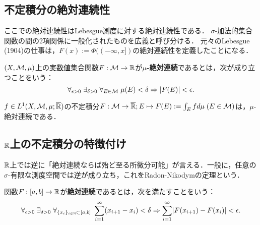 \documentclass[uplatex, dvipdfmx]{jsreport}
\begin{document}
\subsection{不定積分の絶対連続性}

\begin{tcolorbox}[colframe=ForestGreen, colback=ForestGreen!10!white,breakable,colbacktitle=ForestGreen!40!white,coltitle=black,fonttitle=\bfseries\sffamily,
title=]
    ここでの絶対連続性はLebesgue測度に対する絶対連続性である．
    $\sigma$-加法的集合関数の間の2項関係に一般化されたものを広義と呼び分ける．
    元々のLebesgue (1904)の仕事は，$F(x):=\Phi((-\infty,x])$の絶対連続性を定義したことになる．
\end{tcolorbox}

\begin{definition}[集合関数の絶対連続性]
    $(X,\mathcal{M},\mu)$上の\underline{実数値}集合関数$F:\mathcal{M}\to\mathbb{R}$が\textbf{$\mu$-絶対連続}であるとは，次が成り立つことをいう：
    \[\forall_{\epsilon>0}\;\exists_{\delta>0}\;\forall_{E\in\mathcal{M}}\;\mu(E)<\delta\Rightarrow\lvert F(E)\rvert<\epsilon.\]
\end{definition}

\begin{theorem}
    $f\in L^1(X,\mathcal{M},\mu;\overline{\mathbb{R}})$の不定積分$F:\mathcal{M}\to\overline{\mathbb{R}};E\mapsto F(E):=\int_Efd\mu\;(E\in\mathcal{M})$は，$\mu$-絶対連続である．
\end{theorem}

\subsection{$\mathbb{R}$上の不定積分の特徴付け}

\begin{tcolorbox}[colframe=ForestGreen, colback=ForestGreen!10!white,breakable,colbacktitle=ForestGreen!40!white,coltitle=black,fonttitle=\bfseries\sffamily,
title=不定積分であるとは絶対連続であるということである]
    $\mathbb{R}$上では逆に「絶対連続ならば殆ど至る所微分可能」が言える．一般に，任意の$\sigma$-有限な測度空間では逆が成り立ち，これをRadon-Nikodymの定理という．
\end{tcolorbox}

\begin{definition}[実数上の関数の絶対連続性]
    関数$F:[a,b]\to\mathbb{R}$が\textbf{絶対連続}であるとは，次を満たすことをいう：
    \[\forall_{\epsilon>0}\;\exists_{\delta>0}\;\forall_{\{x_i\}_{i\in\mathbb{N}}\subset[a,b]}\;\sum^{\infty}_{i=1}(x_{i+1}-x_i)<\delta\Rightarrow\sum^\infty_{i=1}\lvert F(x_{i+1})-F(x_i)\rvert<\epsilon.\]
\end{definition}
\end{document}
